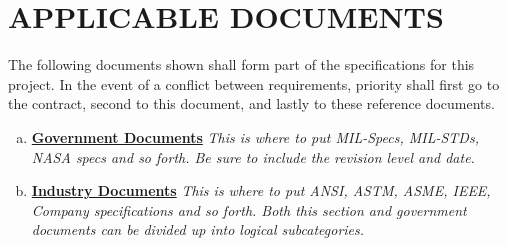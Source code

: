 \section{APPLICABLE DOCUMENTS}

The following documents shown shall form part of the specifications for this project. In the event of a conflict between requirements, priority shall first go to the contract, second to this 
document, and lastly to these reference documents.



\begin{enumerate}[(a)]
	\item \textbf{\underline{Government Documents}}
		\it{
			This is where to put MIL-Specs, MIL-STDs, NASA specs and so forth. Be 
			sure to include the revision level and date.}
	\item \textbf{\underline{Industry Documents}}	
		\it{
			This is where to put ANSI, ASTM, ASME, IEEE, Company specifications and 
			so forth. Both this section and government documents can be divided up 
			into logical subcategories.}
\end{enumerate}


